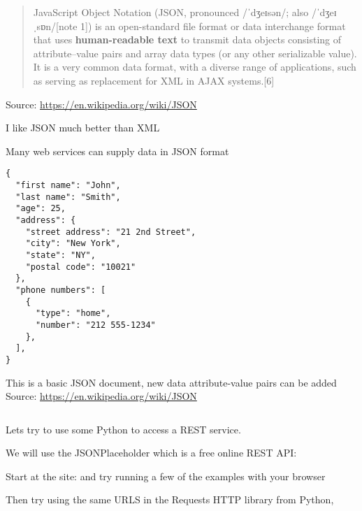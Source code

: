 \documentclass[Screen16to9,17pt]{foils}
\begin{document}

\begin{quote}
JavaScript Object Notation (JSON, pronounced /ˈdʒeɪsən/; also /ˈdʒeɪˌsɒn/[note 1]) is an open-standard file format or data interchange format that uses {\bf human-readable text} to transmit data objects consisting of attribute–value pairs and array data types (or any other serializable value). It is a very common data format, with a diverse range of applications, such as serving as replacement for XML in AJAX systems.[6]
\end{quote}
Source: \url{https://en.wikipedia.org/wiki/JSON}

\begin{list2}
\item I like JSON much better than XML
\item Many web services can supply data in JSON format
\end{list2}


\begin{verbatim}
{
  "first name": "John",
  "last name": "Smith",
  "age": 25,
  "address": {
    "street address": "21 2nd Street",
    "city": "New York",
    "state": "NY",
    "postal code": "10021"
  },
  "phone numbers": [
    {
      "type": "home",
      "number": "212 555-1234"
    },
  ],
}
\end{verbatim}

\begin{list2}
\item This is a basic JSON document, new data attribute-value pairs can be added\\
Source: \url{https://en.wikipedia.org/wiki/JSON}
\end{list2}





\inputminted{python}{programs/rest-1.py}

\begin{list2}
\item  Lets try to use some Python to access a REST service.
\item  We will use the JSONPlaceholder which is a free online REST API:
\item Start at the site:  and try running a few of the examples with your browser
\item Then try using the same URLS in the Requests HTTP library from Python,\\
\end{list2}
\end{document}
